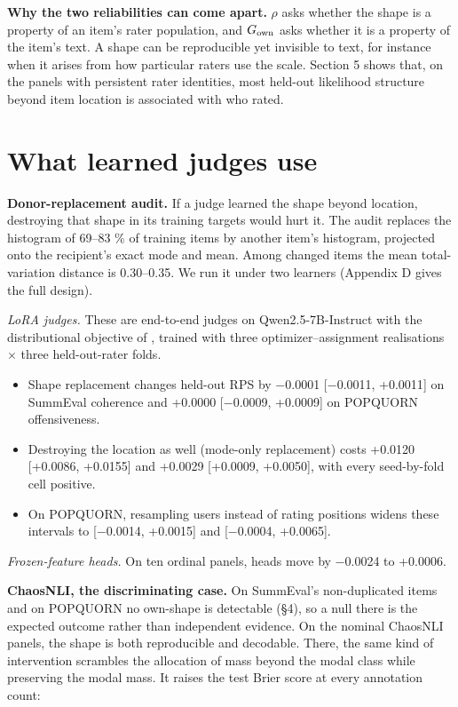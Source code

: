 \documentclass[10pt,twocolumn]{article}
\providecommand{\tightlist}{\setlength{\itemsep}{0pt}\setlength{\parskip}{0pt}}
\begin{document}
\textbf{Why the two reliabilities can come apart.} \(\rho\) asks whether the shape is a property of an item's rater population, and \(G_{\rm own}\) asks whether it is a property of the item's text. A shape can be reproducible yet invisible to text, for instance when it arises from how particular raters use the scale. Section 5 shows that, on the panels with persistent rater identities, most held-out likelihood structure beyond item location is associated with who rated.

\section{What learned judges use}

\textbf{Donor-replacement audit.} If a judge learned the shape beyond location, destroying that shape in its training targets would hurt it. The audit replaces the histogram of 69--83 \% of training items by another item's histogram, projected onto the recipient's exact mode and mean. Among changed items the mean total-variation distance is 0.30--0.35. We run it under two learners (Appendix D gives the full design).

\emph{LoRA judges.} These are end-to-end judges on Qwen2.5-7B-Instruct with the distributional objective of \citet{chen2025beyond}, trained with three optimizer--assignment realisations $\times$ three held-out-rater folds.

\begin{itemize}
\tightlist
\item
  Shape replacement changes held-out RPS by $-$0.0001 {[}$-$0.0011, +0.0011{]} on SummEval coherence and +0.0000 {[}$-$0.0009, +0.0009{]} on POPQUORN offensiveness.
\item
  Destroying the location as well (mode-only replacement) costs +0.0120 {[}+0.0086, +0.0155{]} and +0.0029 {[}+0.0009, +0.0050{]}, with every seed-by-fold cell positive.
\item
  On POPQUORN, resampling users instead of rating positions widens these intervals to {[}$-$0.0014, +0.0015{]} and {[}$-$0.0004, +0.0065{]}.
\end{itemize}

\emph{Frozen-feature heads.} On ten ordinal panels, heads move by $-$0.0024 to +0.0006.

\textbf{ChaosNLI, the discriminating case.} On SummEval's non-duplicated items and on POPQUORN no own-shape is detectable (\S{}4), so a null there is the expected outcome rather than independent evidence. On the nominal ChaosNLI panels, the shape is both reproducible and decodable. There, the same kind of intervention scrambles the allocation of mass beyond the modal class while preserving the modal mass. It raises the test Brier score at every annotation count:
\end{document}
